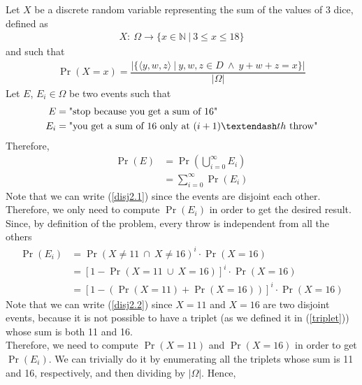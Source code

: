 Let $X$ be a discrete random variable representing the sum of the values of 3 dice, defined as
\begin{align*}
	X: \ \Omega \longrightarrow \{ x \in \mathbb{N} \ | \ 3 \leq x \leq 18 \}
\end{align*}
and such that
\begin{align}
	\Pr(X = x) = \dfrac{|\{ \langle y,w,z \rangle \ | \ y,w,z \in D \ \wedge \ y+w+z = x \}|}{|\Omega|} \label{triplet}
\end{align}
Let $E$, $E_i \in \Omega$ be two events such that
\begin{align*}
	E &= \text{"stop because you get a sum of 16"}\\
	E_i &= \text{"you get a sum of 16 only at $(i+1) \textendash th$ throw"}
\end{align*}
Therefore,
\begin{align}
	\Pr(E) &= \Pr\left(\bigcup_{i = 0}^{\infty} E_i \right) \nonumber\\
		&= \sum_{i = 0}^{\infty}\Pr(E_i) \label{disj2.1}
\end{align}
Note that we can write (\ref{disj2.1}) since the events are disjoint each other.\\
Therefore, we only need to compute $\Pr(E_i)$ in order to get the desired result. Since, by definition of the problem, every throw is independent from all the others
\begin{align}
	\Pr(E_i) &= \Pr( X \ne 11 \ \cap \ X \ne 16 )^i \cdot \Pr(X = 16) \nonumber\\
			&= [1 - \Pr( X = 11 \ \cup \ X = 16)]^i \cdot \Pr(X = 16) \nonumber\\
			&= [1 - (\Pr(X = 11) + \Pr( X = 16))]^i \cdot \Pr(X = 16) \label{disj2.2}
\end{align}
Note that we can write (\ref{disj2.2}) since $X = 11$ and $X = 16$ are two disjoint events, because it is not possible to have a triplet (as we defined it in (\ref{triplet})) whose sum is both 11 and 16.\\
Therefore, we need to compute $\Pr(X = 11)$ and $\Pr( X = 16)$ in order to get $\Pr(E_i)$. We can trivially do it by enumerating all the triplets whose sum is 11 and 16, respectively, and then dividing by $|\Omega|$. Hence,

